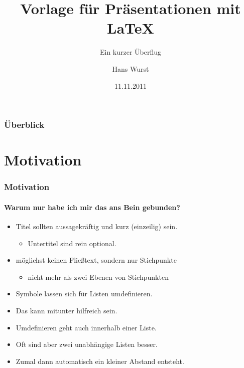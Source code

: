 \documentclass[utf8]{beamer}
\title[Präsentationen mit \LaTeX{}]{Vorlage für Präsentationen mit \LaTeX{}}
\subtitle[]{Ein kurzer Überflug}
\author[H. Wurst]{Hans Wurst}
\date{11.11.2011}
\institute[IPC]{Institut für Physikalische Chemie\\ Albert-Ludwigs-Universität Freiburg}
\begin{document}
\begin{frame}[plain]
\titlepage
\end{frame}


\begin{frame}
\frametitle{Überblick}

\tableofcontents

\end{frame}


\section{Motivation}


\begin{frame}
\frametitle{Motivation}
\framesubtitle{Warum nur habe ich mir das ans Bein gebunden?}

\begin{itemize}
\item Titel sollten aussagekräftig und kurz (einzeilig) sein.
\begin{itemize}
\item Untertitel sind rein optional.
\end{itemize}

\item möglichst keinen Fließtext, sondern nur Stichpunkte
\begin{itemize}
\item nicht mehr als zwei Ebenen von Stichpunkten
\end{itemize}
\end{itemize}

\begin{itemize}
\item Symbole lassen sich für Listen umdefinieren.
\item Das kann mitunter hilfreich sein.
\item Umdefinieren geht auch innerhalb einer Liste.
\end{itemize}

\begin{itemize}
\item Oft sind aber zwei unabhängige Listen besser.
\item Zumal dann automatisch ein kleiner Abstand entsteht.
\end{itemize}

\end{frame}
\end{document}
